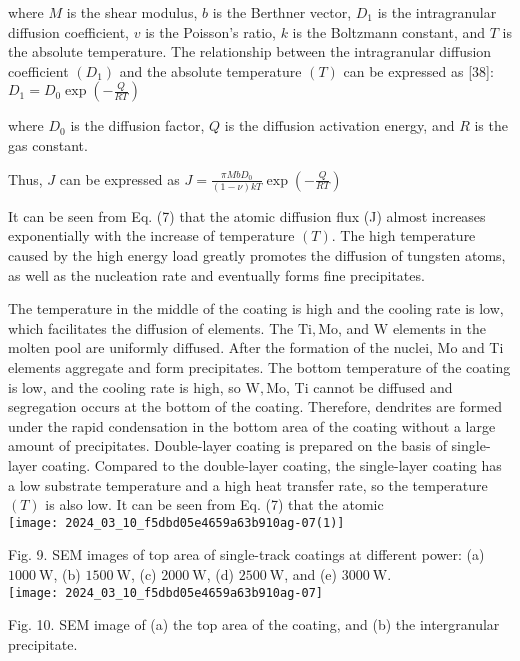 \documentclass[10pt]{article}
\begin{document}
where $M$ is the shear modulus, $b$ is the Berthner vector, $D_{1}$ is the intragranular diffusion coefficient, $v$ is the Poisson's ratio, $k$ is the Boltzmann constant, and $T$ is the absolute temperature. The relationship between the intragranular diffusion coefficient $\left(D_{1}\right)$ and the absolute temperature $(T)$ can be expressed as [38]: $D_{1}=D_{0} \exp \left(-\frac{Q}{R T}\right)$

where $D_{0}$ is the diffusion factor, $Q$ is the diffusion activation energy, and $R$ is the gas constant.

Thus, $J$ can be expressed as $J=\frac{\pi M b D_{0}}{(1-\nu) k T} \exp \left(-\frac{Q}{R T}\right)$

It can be seen from Eq. (7) that the atomic diffusion flux (J) almost increases exponentially with the increase of temperature $(T)$. The high temperature caused by the high energy load greatly promotes the diffusion of tungsten atoms, as well as the nucleation rate and eventually forms fine precipitates.

The temperature in the middle of the coating is high and the cooling rate is low, which facilitates the diffusion of elements. The $\mathrm{Ti}, \mathrm{Mo}$, and $\mathrm{W}$ elements in the molten pool are uniformly diffused. After the formation of the nuclei, Mo and Ti elements aggregate and form precipitates. The bottom temperature of the coating is low, and the cooling rate is high, so $\mathrm{W}, \mathrm{Mo}$, Ti cannot be diffused and segregation occurs at the bottom of the coating. Therefore, dendrites are formed under the rapid condensation in the bottom area of the coating without a large amount of precipitates. Double-layer coating is prepared on the basis of single-layer coating. Compared to the double-layer coating, the single-layer coating has a low substrate temperature and a high heat transfer rate, so the temperature $(T)$ is also low. It can be seen from Eq. (7) that the atomic\\
\texttt{[image: 2024\_03\_10\_f5dbd05e4659a63b910ag-07(1)]}

Fig. 9. SEM images of top area of single-track coatings at different power: (a) $1000 \mathrm{~W}$, (b) $1500 \mathrm{~W}$, (c) $2000 \mathrm{~W}$, (d) $2500 \mathrm{~W}$, and (e) $3000 \mathrm{~W}$.\\
\texttt{[image: 2024\_03\_10\_f5dbd05e4659a63b910ag-07]}

Fig. 10. SEM image of (a) the top area of the coating, and (b) the intergranular precipitate.
\end{document}
